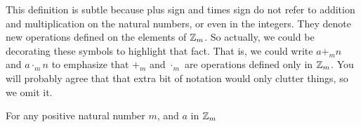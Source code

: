 This definition is subtle because plus sign and times sign do not refer to addition and multiplication on the natural numbers, or even in the integers. They denote new operations defined on the elements of ${\mathbb Z}_m$. So actually, we could be decorating these symbols to highlight that fact. That is, we could write $a+_m n$ and $a\cdot_m n$ to emphasize that $+_m$ and $\cdot_m$ are operations defined only in ${\mathbb Z}_m$. You will probably agree that that extra bit of notation would only clutter things, so we omit it.

\begin{lem}
	For any positive natural number $m$, and $a$ in ${\mathbb Z}_m$ 
\end{lem}
